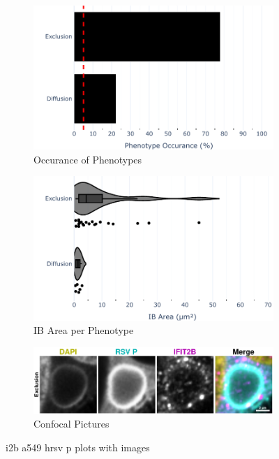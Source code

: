 \begin{figure}
    \begin{subfigure}{0.5\textwidth}
    \includegraphics[width=1\linewidth]{10. Chapter 5/Figs/01. Infection/02. IFIT2B/04. bar_i2b_a549-p.pdf} 
    \caption[]{Occurance of Phenotypes}
    \end{subfigure}
    \begin{subfigure}{0.5\textwidth}
    \includegraphics[width=1\linewidth]{10. Chapter 5/Figs/01. Infection/02. IFIT2B/05. violin_i2b_a549-p.pdf}
    \caption[]{IB Area per Phenotype}
    \end{subfigure}

    \begin{subfigure}{1\textwidth}
    \includegraphics[width=1\linewidth]{10. Chapter 5/Figs/01. Infection/02. IFIT2B/06. i2b a549 hrsv p.pdf} 
    \caption[]{Confocal Pictures}
    \end{subfigure}
    \caption[i2b a549 hrsv p plots with images]{i2b a549 hrsv p plots with images}
    \label{fig:i2b a549 hrsv p plots with images}
\end{figure}

